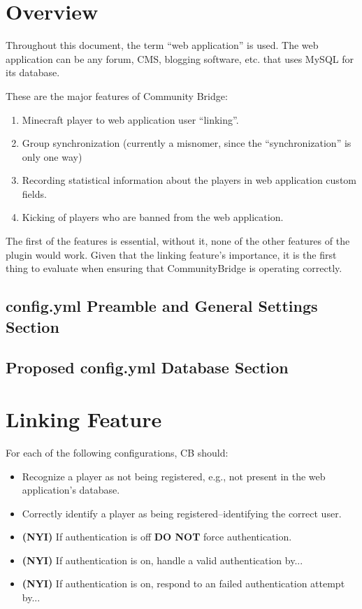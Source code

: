 \documentclass[letterpaper,12pt]{article}
\begin{document}
  \section{Overview}
  Throughout this document, the term ``web application'' is used. The web
  application can be any forum, CMS, blogging software, etc. that uses MySQL for
  its database.
  
  These are the major features of Community Bridge:
  \begin{enumerate}
    \item Minecraft player to web application user ``linking''.
    \item Group synchronization (currently a misnomer, since the
          ``synchronization'' is only one way)
    \item Recording statistical information about the players in web
          application custom fields.
    \item Kicking of players who are banned from the web application.
  \end{enumerate}
  
  The first of the features is essential, without it, none of the other
  features of the plugin would work. Given that the linking feature's
  importance, it is the first thing to evaluate when ensuring that
  CommunityBridge is operating correctly.

  \clearpage
  \subsection{config.yml Preamble and General Settings Section}
  

  \clearpage
  \subsection{Proposed config.yml Database Section}
  

  \clearpage
  \section{Linking Feature}
  For each of the following configurations, CB should:
  \begin{itemize}
    \item Recognize a player as not being registered, e.g., not present in the
    web application's database.
    \item Correctly identify a player as being registered--identifying the
    correct user.
    \item {\bf (NYI)} If authentication is off {\bf DO NOT} force authentication.
    \item {\bf (NYI)} If authentication is on, handle a valid authentication by...
    \item {\bf (NYI)} If authentication is on, respond to an failed authentication attempt by...
  \end{itemize}
\end{document}

